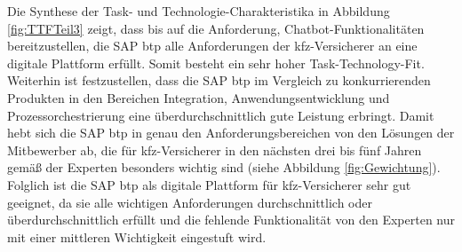 Die Synthese der Task- und Technologie-Charakteristika in Abbildung \ref{fig:TTFTeil3} zeigt, dass bis auf die Anforderung, Chatbot-Funktionalitäten bereitzustellen, die SAP \ac{btp} alle Anforderungen der \ac{kfz}-Versicherer an eine digitale Plattform erfüllt. Somit besteht ein sehr hoher Task-Technology-Fit. Weiterhin ist festzustellen, dass die SAP \ac{btp} im Vergleich zu konkurrierenden Produkten in den Bereichen Integration, Anwendungsentwicklung und Prozessorchestrierung eine überdurchschnittlich gute Leistung erbringt. Damit hebt sich die SAP \ac{btp} in genau den Anforderungsbereichen von den Lösungen der Mitbewerber ab, die für \ac{kfz}-Versicherer in den nächsten drei bis fünf Jahren gemäß der Experten besonders wichtig sind (siehe Abbildung \ref{fig:Gewichtung}). Folglich ist die SAP \ac{btp} als digitale Plattform für \ac{kfz}-Versicherer sehr gut geeignet, da sie alle wichtigen Anforderungen durchschnittlich oder überdurchschnittlich erfüllt und die fehlende Funktionalität von den Experten nur mit einer mittleren Wichtigkeit eingestuft wird. 





\newpage
